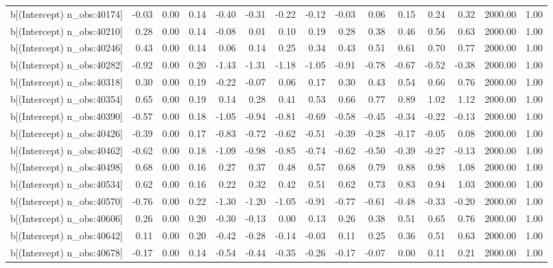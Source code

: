 \begin{table}[ht]
\begin{tabular}{rrrrrrrrrrrrrrr}
  b[(Intercept) n\_obs:40174] & -0.03 & 0.00 & 0.14 & -0.40 & -0.31 & -0.22 & -0.12 & -0.03 & 0.06 & 0.15 & 0.24 & 0.32 & 2000.00 & 1.00 \\ 
  b[(Intercept) n\_obs:40210] & 0.28 & 0.00 & 0.14 & -0.08 & 0.01 & 0.10 & 0.19 & 0.28 & 0.38 & 0.46 & 0.56 & 0.63 & 2000.00 & 1.00 \\ 
  b[(Intercept) n\_obs:40246] & 0.43 & 0.00 & 0.14 & 0.06 & 0.14 & 0.25 & 0.34 & 0.43 & 0.51 & 0.61 & 0.70 & 0.77 & 2000.00 & 1.00 \\ 
  b[(Intercept) n\_obs:40282] & -0.92 & 0.00 & 0.20 & -1.43 & -1.31 & -1.18 & -1.05 & -0.91 & -0.78 & -0.67 & -0.52 & -0.38 & 2000.00 & 1.00 \\ 
  b[(Intercept) n\_obs:40318] & 0.30 & 0.00 & 0.19 & -0.22 & -0.07 & 0.06 & 0.17 & 0.30 & 0.43 & 0.54 & 0.66 & 0.76 & 2000.00 & 1.00 \\ 
  b[(Intercept) n\_obs:40354] & 0.65 & 0.00 & 0.19 & 0.14 & 0.28 & 0.41 & 0.53 & 0.66 & 0.77 & 0.89 & 1.02 & 1.12 & 2000.00 & 1.00 \\ 
  b[(Intercept) n\_obs:40390] & -0.57 & 0.00 & 0.18 & -1.05 & -0.94 & -0.81 & -0.69 & -0.58 & -0.45 & -0.34 & -0.22 & -0.13 & 2000.00 & 1.00 \\ 
  b[(Intercept) n\_obs:40426] & -0.39 & 0.00 & 0.17 & -0.83 & -0.72 & -0.62 & -0.51 & -0.39 & -0.28 & -0.17 & -0.05 & 0.08 & 2000.00 & 1.00 \\ 
  b[(Intercept) n\_obs:40462] & -0.62 & 0.00 & 0.18 & -1.09 & -0.98 & -0.85 & -0.74 & -0.62 & -0.50 & -0.39 & -0.27 & -0.13 & 2000.00 & 1.00 \\ 
  b[(Intercept) n\_obs:40498] & 0.68 & 0.00 & 0.16 & 0.27 & 0.37 & 0.48 & 0.57 & 0.68 & 0.79 & 0.88 & 0.98 & 1.08 & 2000.00 & 1.00 \\ 
  b[(Intercept) n\_obs:40534] & 0.62 & 0.00 & 0.16 & 0.22 & 0.32 & 0.42 & 0.51 & 0.62 & 0.73 & 0.83 & 0.94 & 1.03 & 2000.00 & 1.00 \\ 
  b[(Intercept) n\_obs:40570] & -0.76 & 0.00 & 0.22 & -1.30 & -1.20 & -1.05 & -0.91 & -0.77 & -0.61 & -0.48 & -0.33 & -0.20 & 2000.00 & 1.00 \\ 
  b[(Intercept) n\_obs:40606] & 0.26 & 0.00 & 0.20 & -0.30 & -0.13 & 0.00 & 0.13 & 0.26 & 0.38 & 0.51 & 0.65 & 0.76 & 2000.00 & 1.00 \\ 
  b[(Intercept) n\_obs:40642] & 0.11 & 0.00 & 0.20 & -0.42 & -0.28 & -0.14 & -0.03 & 0.11 & 0.25 & 0.36 & 0.51 & 0.63 & 2000.00 & 1.00 \\ 
  b[(Intercept) n\_obs:40678] & -0.17 & 0.00 & 0.14 & -0.54 & -0.44 & -0.35 & -0.26 & -0.17 & -0.07 & 0.00 & 0.11 & 0.21 & 2000.00 & 1.00 \\ 

\end{tabular}
\end{table}
